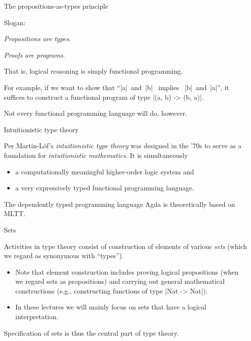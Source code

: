 \documentclass[t,compress,hyperref={hidelinks}]{beamer}
\begin{document}
\begin{frame}{The propositions-as-types principle}

Slogan:
\begin{center}
\emph{Propositions are types.}

\emph{Proofs are programs.}
\end{center}

That is, logical reasoning is simply functional programming.

For example, if we want to show that ``|a|~and~|b| ~implies~ |b|~and~|a|'', it suffices to construct a functional program of type |(a, b) -> (b, a)|.

Not every functional programming language will do, however.

\end{frame}

\begin{frame}{Intuitionistic type theory}

Per Martin-Löf's \emph{intuitionistic type theory} was designed in the '70s to serve as a foundation for \emph{intuitionistic mathematics}.
It is simultaneously
\begin{itemize}
\item a computationally meaningful higher-order logic system and
\item a very expressively typed functional programming language.
\end{itemize}

The dependently typed programming language Agda is theoretically based on MLTT.

\end{frame}

\begin{frame}{Sets}

Activities in type theory consist of construction of elements of various \emph{sets} (which we regard as synonymous with ``types'').
\begin{itemize}
\item Note that element construction includes proving logical propositions (when we regard sets as propositions) and carrying out general mathematical constructions (e.g., constructing functions of type |Nat -> Nat|).
\item In these lectures we will mainly focus on sets that have a logical interpretation.
\end{itemize}

Specification of sets is thus the central part of type theory.

\end{frame}
\end{document}
